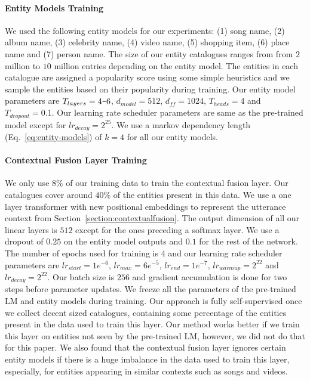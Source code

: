 \documentclass{article}
\begin{document}
\paragraph{Entity Models Training} We used the following entity models for our experiments: (1) song name, (2) album name, (3) celebrity name, (4) video name, (5) shopping item, (6) place name and (7) person name. The size of our entity catalogues ranges from from $2$ million to $10$ million entries depending on the entity model. The entities in each catalogue are assigned a popularity score using some simple heuristics and we sample the entities based on their popularity during training. Our entity model parameters are $T_{layers} = 4\verb|-|6$, $d_{model} = 512$, $d_{ff} = 1024$, $T_{heads} = 4$ and $T_{dropout} = 0.1$. Our learning rate scheduler parameters are same as the pre-trained model except for $lr_{decay} = 2^{25}$. We use a markov dependency length (Eq.~\ref{eq:entity-models}) of $k = 4$ for all our entity models.

\paragraph{Contextual Fusion Layer Training} We only use $8\%$ of our training data to train the contextual fusion layer. Our catalogues cover around $40\%$ of the entities present in this data. We use a one layer transformer with new positional embeddings to represent the utterance context from Section~\ref{section:contextualfusion}. The output dimension of all our linear layers is $512$ except for the ones preceding a softmax layer. We use a dropout of $0.25$ on the entity model outputs and $0.1$ for the rest of the network. The number of epochs used for training is $4$ and our learning rate scheduler parameters are $lr_{start} = 1e^{-6}$, $lr_{max} = 6e^{-5}$, $lr_{end} = 1e^{-7}$, $lr_{warmup} = 2^{22}$ and $lr_{decay} = 2^{22}$. Our batch size is $256$ and gradient accumulation is done for two steps before parameter updates. We freeze all the parameters of the pre-trained LM and entity models during training. Our approach is fully self-supervised once we collect decent sized catalogues, containing some percentage of the entities present in the data used to train this layer. Our method works better if we train this layer on entities not seen by the pre-trained LM, however, we did not do that for this paper. We also found that the contextual fusion layer ignores certain entity models if there is a huge imbalance in the data used to train this layer, especially, for entities appearing in similar contexts such as songs and videos.
\end{document}
